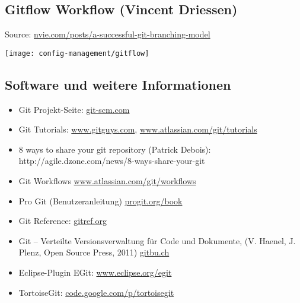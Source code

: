 \subsection{Gitflow Workflow (Vincent Driessen)}
Source: \href{http://nvie.com/posts/a-successful-git-branching-model}
  {nvie.com/posts/a-successful-git-branching-model}
\begin{center}
\texttt{[image: config-management/gitflow]}
\end{center}
%
%
\newslide

\subsection{Software und weitere Informationen}
\begin{itemize}
\item Git Projekt-Seite: \href{http://git-scm.com/}{git-scm.com}
\item Git Tutorials: \href{http://www.gitguys.com}{www.gitguys.com},
   \href{https://www.atlassian.com/git/tutorials}{www.atlassian.com/git/tutorials}
\item 8 ways to share your git repository (Patrick Debois):\\
  \href{http://agile.dzone.com/news/8-ways-share-your-git}
   {}http://agile.dzone.com/news/8-ways-share-your-git
\item Git Workflows \href{https://www.atlassian.com/git/workflows}
         {www.atlassian.com/git/workflows}
\item Pro Git (Benutzeranleitung)
  \href{http://progit.org/book}{progit.org/book}
\item Git Reference: \href{http://gitref.org}{gitref.org}
\item Git -- Verteilte Versionsverwaltung für Code und Dokumente,
(V. Haenel, J. Plenz, Open Source Press, 2011)
\href{http://gitbu.ch}{gitbu.ch}
\item Eclipse-Plugin EGit:
  \href{http://www.eclipse.org/egit}{www.eclipse.org/egit}
\item TortoiseGit: \href{http://code.google.com/p/tortoisegit}
    {code.google.com/p/tortoisegit}
\end{itemize}
%
%
%
%
%

